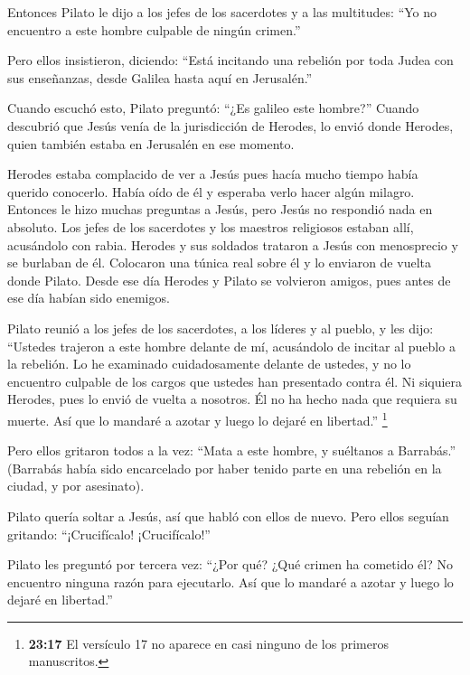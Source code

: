  Entonces Pilato le dijo a los jefes de los sacerdotes y a
las multitudes: ``Yo no encuentro a este hombre culpable de ningún
crimen.''

 Pero ellos insistieron, diciendo: ``Está incitando una
rebelión por toda Judea con sus enseñanzas, desde Galilea hasta aquí en
Jerusalén.''

 Cuando escuchó esto, Pilato preguntó: ``¿Es galileo este
hombre?''  Cuando descubrió que Jesús venía de la
jurisdicción de Herodes, lo envió donde Herodes, quien también estaba en
Jerusalén en ese momento.

 Herodes estaba complacido de ver a Jesús pues hacía mucho
tiempo había querido conocerlo. Había oído de él y esperaba verlo hacer
algún milagro.  Entonces le hizo muchas preguntas a Jesús,
pero Jesús no respondió nada en absoluto.  Los jefes de los
sacerdotes y los maestros religiosos estaban allí, acusándolo con rabia.
 Herodes y sus soldados trataron a Jesús con menosprecio y
se burlaban de él. Colocaron una túnica real sobre él y lo enviaron de
vuelta donde Pilato.  Desde ese día Herodes y Pilato se
volvieron amigos, pues antes de ese día habían sido enemigos.

 Pilato reunió a los jefes de los sacerdotes, a los líderes
y al pueblo,  y les dijo: ``Ustedes trajeron a este hombre
delante de mí, acusándolo de incitar al pueblo a la rebelión. Lo he
examinado cuidadosamente delante de ustedes, y no lo encuentro culpable
de los cargos que ustedes han presentado contra él.  Ni
siquiera Herodes, pues lo envió de vuelta a nosotros. Él no ha hecho
nada que requiera su muerte.  Así que lo mandaré a azotar y
luego lo dejaré en libertad.''  \footnote{\textbf{23:17} El
  versículo 17 no aparece en casi ninguno de los primeros manuscritos.}

 Pero ellos gritaron todos a la vez: ``Mata a este hombre,
y suéltanos a Barrabás.''  (Barrabás había sido encarcelado
por haber tenido parte en una rebelión en la ciudad, y por asesinato).

 Pilato quería soltar a Jesús, así que habló con ellos de
nuevo.  Pero ellos seguían gritando: ``¡Crucifícalo!
¡Crucifícalo!''

 Pilato les preguntó por tercera vez: ``¿Por qué? ¿Qué
crimen ha cometido él? No encuentro ninguna razón para ejecutarlo. Así
que lo mandaré a azotar y luego lo dejaré en libertad.''

